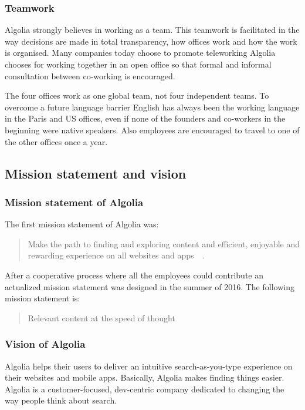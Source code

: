 \subsubsection{Teamwork}

Algolia strongly believes in working as a team. This teamwork is facilitated in the way decisions are made in total transparency, how offices work and how the work is organised. Many companies today choose to promote teleworking Algolia chooses for working together in an open office so that formal and informal consultation between co-working is encouraged.

The four offices work as one global team, not four independent teams. To overcome a future language barrier English has always been the working language in the Paris and US offices, even if none of the founders and co-workers in the beginning were native speakers. Also employees are encouraged to travel to one of the other offices once a year. 

\subsection{Mission statement and vision}
\subsubsection{Mission statement of Algolia}

The first mission statement of Algolia was:

\begin{quote}
Make the path to finding and exploring content and efficient, enjoyable and rewarding experience on all websites and apps~\cite{algolia-glassdoor}~.
\end{quote}

After a cooperative process where all the employees could contribute an actualized mission statement was designed in the summer of 2016. The following mission statement is:

\begin{quote}
Relevant content at the speed of thought
\end{quote}

\subsubsection{Vision of Algolia}

Algolia helps their users to deliver an intuitive search-as-you-type experience on their websites and mobile apps. Basically, Algolia makes finding things easier. Algolia is a customer-focused, dev-centric company dedicated to changing the way people think about search.

